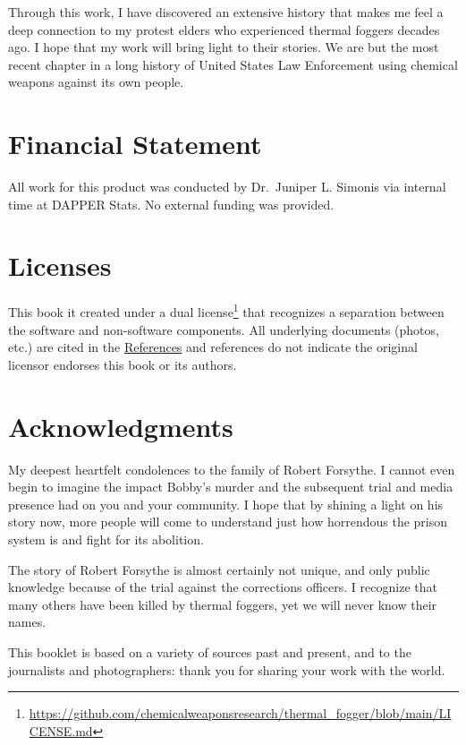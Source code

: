 \documentclass[
  11pt,
]{krantz}
\renewcommand{\href}[2]{#2\footnote{\url{#1}}}
\begin{document}
Through this work, I have discovered an extensive history that makes me feel a deep connection to my protest elders who experienced thermal foggers decades ago.
I hope that my work will bring light to their stories.
We are but the most recent chapter in a long history of United States Law Enforcement using chemical weapons against its own people.

\hypertarget{financial-statement}{%
\section*{Financial Statement}\label{financial-statement}}


All work for this product was conducted by Dr.~Juniper L. Simonis via internal time at DAPPER Stats.
No external funding was provided.

\hypertarget{licenses}{%
\section*{Licenses}\label{licenses}}


This book it created under a \href{https://github.com/chemicalweaponsresearch/thermal_fogger/blob/main/LICENSE.md}{dual license} that recognizes a separation between the software and non-software components.
All underlying documents (photos, etc.) are cited in the \protect\hyperlink{References}{References} and references do not indicate the original licensor endorses this book or its authors.

\hypertarget{acknowledgments}{%
\section*{Acknowledgments}\label{acknowledgments}}


My deepest heartfelt condolences to the family of Robert Forsythe.
I cannot even begin to imagine the impact Bobby's murder and the subsequent trial and media presence had on you and your community.
I hope that by shining a light on his story now, more people will come to understand just how horrendous the prison system is and fight for its abolition.

The story of Robert Forsythe is almost certainly not unique, and only public knowledge because of the trial against the corrections officers.
I recognize that many others have been killed by thermal foggers, yet we will never know their names.

This booklet is based on a variety of sources past and present, and to the journalists and photographers: thank you for sharing your work with the world.
\end{document}
